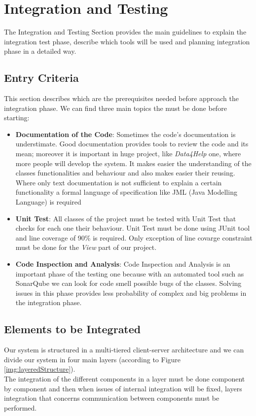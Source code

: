 
\section{Integration and Testing}\label{int_test}
The Integration and Testing Section provides the main guidelines to explain the integration test phase, describe which tools will be used and planning integration phase in a detailed way.

\subsection{Entry Criteria}
This section describes which are the prerequisites needed before approach the integration phase. We can find three main topics the must be done before starting:
\begin{itemize}
  \item \textbf{Documentation of the Code}: Sometimes the code's documentation is understimate. Good documentation provides tools to review the code and its mean; moreover it is important in huge project, like \textit{Data4Help} one, where more people will develop the system. It makes easier the understanding of the classes functionalities and behaviour and also makes easier their reusing.\\
  Where only text documentation is not sufficient to explain a certain functionality a formal language of specification like JML (Java Modelling Language) is required
  \item \textbf{Unit Test}: All classes of the project must be tested with Unit Test that checks for each one their behaviour. Unit Test must be done using JUnit tool and line coverage of 90\% is required. Only exception of line covarge constraint must be done for the \textit{View} part of our project.
  \item \textbf{Code Inspection and Analysis}: Code Inspection and Analysis is an important phase of the testing one because with an automated tool such as SonarQube we can look for code smell possible bugs of the classes. Solving issues in this phase provides less probability of complex and big problems in the integration phase.
\end{itemize}
\subsection{Elements to be Integrated}
Our system is structured in a multi-tiered client-server architecture and we can divide our system in four main layers (according to Figure \ref{img:layeredStructure}).\\
The integration of the different components in a layer must be done component by component and then when issues of internal integration will be fixed, layers integration that concerns communication between components must be performed.

